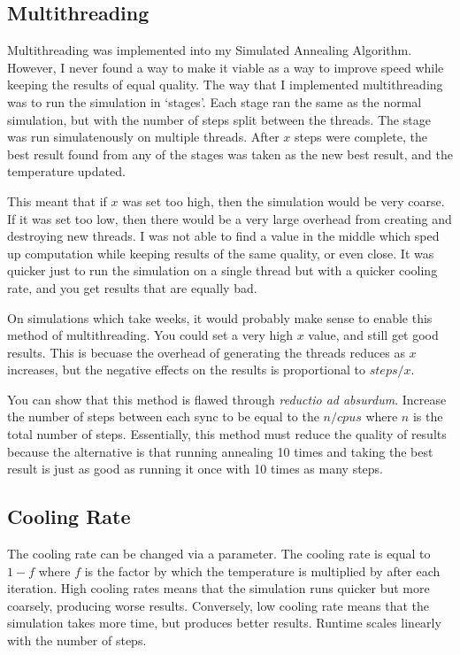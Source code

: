 \documentclass[a4paper, 11pt,table]{article}
\begin{document}
	\subsection{Multithreading}
	Multithreading was implemented into my Simulated Annealing Algorithm. However, I never found a way to make it viable as a way to improve speed while keeping the results of equal quality. The way that I implemented multithreading was to run the simulation in `stages'. Each stage ran the same as the normal simulation, but with the number of steps split between the threads. The stage was run simulatenously on multiple threads. After $x$ steps were complete, the best result found from any of the stages was taken as the new best result, and the temperature updated.
	
	This meant that if $x$ was set too high, then the simulation would be very coarse. If it was set too low, then there would be a very large overhead from creating and destroying new threads. I was not able to find a value in the middle which sped up computation while keeping results of the same quality, or even close. It was quicker just to run the simulation on a single thread but with a quicker cooling rate, and you get results that are equally bad.
	
	On simulations which take weeks, it would probably make sense to enable this method of multithreading. You could set a very high $x$ value, and still get good results. This is becuase the overhead of generating the threads reduces as $x$ increases, but the negative effects on the results is proportional to $steps/x$.
	
	You can show that this method is flawed through \emph{reductio ad absurdum}. Increase the number of steps between each sync to be equal to the $n/cpus$ where $n$ is the total number of steps. Essentially, this method must reduce the quality of results because the alternative is that running annealing 10 times and taking the best result is just as good as running it once with 10 times as many steps.
	
	\subsection{Cooling Rate}
	The cooling rate can be changed via a parameter. The cooling rate is equal to $1-f$ where $f$ is the factor by which the temperature is multiplied by after each iteration. High cooling rates means that the simulation runs quicker but more coarsely, producing worse results. Conversely, low cooling rate means that the simulation takes more time, but produces better results. Runtime scales linearly with the number of steps.
	
\end{document}

